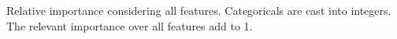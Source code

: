 Relative importance considering all features. Categoricals are cast into integers. The relevant importance over all features add to 1.